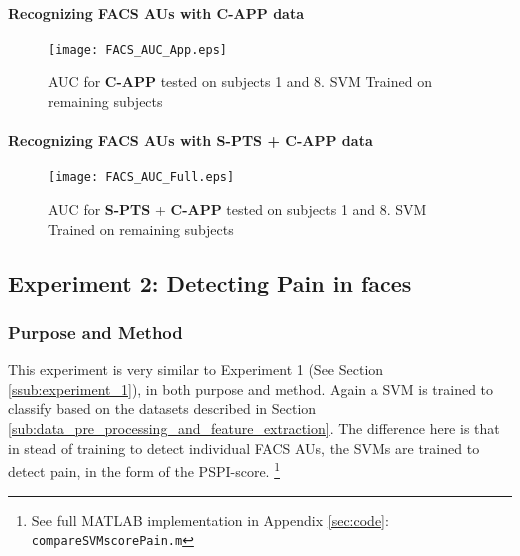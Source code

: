 \documentclass[Main]{subfiles}
\begin{document}

			\paragraph{Recognizing FACS AUs with \textbf{C-APP} data} %
				\label{par:recognizing_facs_aus_with_c_app_data}
				\begin{figure}[H]
					\begin{center}
						\texttt{[image: FACS\_AUC\_App.eps]}
					\end{center}
					\caption{
						AUC for \textbf{C-APP} tested on subjects 1 and 8.
						SVM Trained on remaining subjects
						}
					\label{fig:capp_auc}
				\end{figure}

			\paragraph{Recognizing FACS AUs with \textbf{S-PTS} + \textbf{C-APP} data} %
				\label{par:recognizing_facs_aus_with_s_pts_c_app_data}
				\begin{figure}[H]
					\begin{center}
						\texttt{[image: FACS\_AUC\_Full.eps]}
					\end{center}
					\caption{
						AUC for \textbf{S-PTS} + \textbf{C-APP} tested on subjects 1 and 8.
						SVM Trained on remaining subjects
						}
					\label{fig:full_auc}
				\end{figure}
				
			
		

	\subsection{Experiment 2: Detecting Pain in faces} %
		\label{sub:experiment_2_detecting_pain_in_faces}
		\subsubsection{Purpose and Method} %
			\label{ssub:purpose_and_method_ex2}
			This experiment is very similar to Experiment 1 (See Section \ref{ssub:experiment_1}), in both purpose and method.
			Again a SVM is trained to classify based on the datasets described in Section \ref{sub:data_pre_processing_and_feature_extraction}.
			The difference here is that in stead of training to detect individual FACS AUs, the SVMs are trained to detect pain, in the form of the PSPI-score.
			\footnote{See full MATLAB implementation in Appendix \ref{sec:code}: \texttt{compareSVMscorePain.m}}
			
\end{document}
